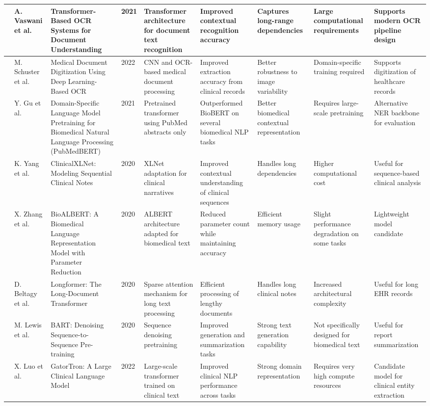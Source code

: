 \begin{landscape}
\begin{singlespace}
\begin{longtable}{|p{0.8cm}|p{1.8cm}|p{3.2cm}|p{0.8cm}|p{3.6cm}|p{3.6cm}|p{2.5cm}|p{2.5cm}|p{3.2cm}|}
\hline
\cite{ref39} & A. Vaswani et al. & Transformer-Based OCR Systems for Document Understanding & 2021 & Transformer architecture for document text recognition & Improved contextual recognition accuracy & Captures long-range dependencies & Large computational requirements & Supports modern OCR pipeline design \\
\hline
\cite{ref40} & M. Schuster et al. & Medical Document Digitization Using Deep Learning-Based OCR & 2022 & CNN and OCR-based medical document processing & Improved extraction accuracy from clinical records & Better robustness to image variability & Domain-specific training required & Supports digitization of healthcare records \\
\hline
\cite{ref41} & Y. Gu et al. & Domain-Specific Language Model Pretraining for Biomedical Natural Language Processing (PubMedBERT) & 2021 & Pretrained transformer using PubMed abstracts only & Outperformed BioBERT on several biomedical NLP tasks & Better biomedical contextual representation & Requires large-scale pretraining & Alternative NER backbone for evaluation \\
\hline
\cite{ref42} & K. Yang et al. & ClinicalXLNet: Modeling Sequential Clinical Notes & 2020 & XLNet adaptation for clinical narratives & Improved contextual understanding of clinical sequences & Handles long dependencies & Higher computational cost & Useful for sequence-based clinical analysis \\
\hline
\cite{ref43} & X. Zhang et al. & BioALBERT: A Biomedical Language Representation Model with Parameter Reduction & 2020 & ALBERT architecture adapted for biomedical text & Reduced parameter count while maintaining accuracy & Efficient memory usage & Slight performance degradation on some tasks & Lightweight model candidate \\
\hline
\cite{ref44} & D. Beltagy et al. & Longformer: The Long-Document Transformer & 2020 & Sparse attention mechanism for long text processing & Efficient processing of lengthy documents & Handles long clinical notes & Increased architectural complexity & Useful for long EHR records \\
\hline
\cite{ref45} & M. Lewis et al. & BART: Denoising Sequence-to-Sequence Pre-training & 2020 & Sequence denoising pretraining & Improved generation and summarization tasks & Strong text generation capability & Not specifically designed for biomedical text & Useful for report summarization \\
\hline
\cite{ref46} & X. Luo et al. & GatorTron: A Large Clinical Language Model & 2022 & Large-scale transformer trained on clinical text & Improved clinical NLP performance across tasks & Strong domain representation & Requires very high compute resources & Candidate model for clinical entity extraction \\

\end{longtable}
\end{singlespace}
\end{landscape}
